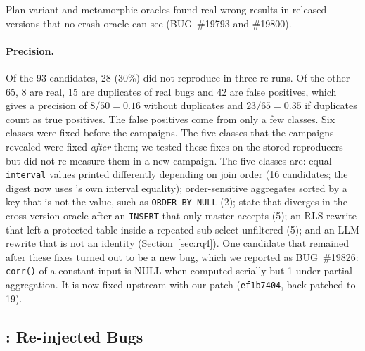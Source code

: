 \begin{observation}
\label{obs:wrong}
Plan-variant and metamorphic oracles found real wrong results in released
versions that no crash oracle can see (BUG~\#19793 and \#19800).
\end{observation}

\paragraph{Precision.} Of the 93 candidates, 28 (30\%) did not reproduce in
three re-runs. Of the other 65, 8 are real, 15 are duplicates of real bugs and
42 are false positives, which gives a precision of $8/50=0.16$ without
duplicates and $23/65=0.35$ if duplicates count as true positives. The false
positives come from only a few classes. Six classes were fixed before the
campaigns. The five classes that the campaigns revealed were fixed \emph{after}
them; we tested these fixes on the stored reproducers but did not re-measure
them in a new campaign. The five classes are: equal \texttt{interval} values
printed differently depending on join order (16 candidates; the digest now uses
\pg's own interval equality); order-sensitive aggregates sorted by a key that is
not the value, such as \texttt{ORDER BY NULL} (2); state that diverges in the
cross-version oracle after an \texttt{INSERT} that only master accepts (5); an
RLS rewrite that left a protected table inside a repeated sub-select unfiltered
(5); and an LLM rewrite that is not an identity (Section~\ref{sec:rq4}). One
candidate that remained after these fixes turned out to be a new bug, which we
reported as BUG~\#19826: \texttt{corr()} of a constant input is NULL when
computed serially but 1 under partial aggregation. It is now fixed upstream with
our patch (\texttt{ef1b7404}, back-patched to 19).

\subsection{: Re-injected Bugs}
\label{sec:rq3}

\begin{table}[t]
  \centering
  \small
  \caption{: trials (of 5) in which an arm found each re-injected bug,
  with the median time to the first finding. The rows below list, per symptom,
  how many bugs an arm found at all. Only bugs found by some arm have their own
  row; 18 of 20 were found by none.}
  \label{tab:rq3}
  
\end{table}

